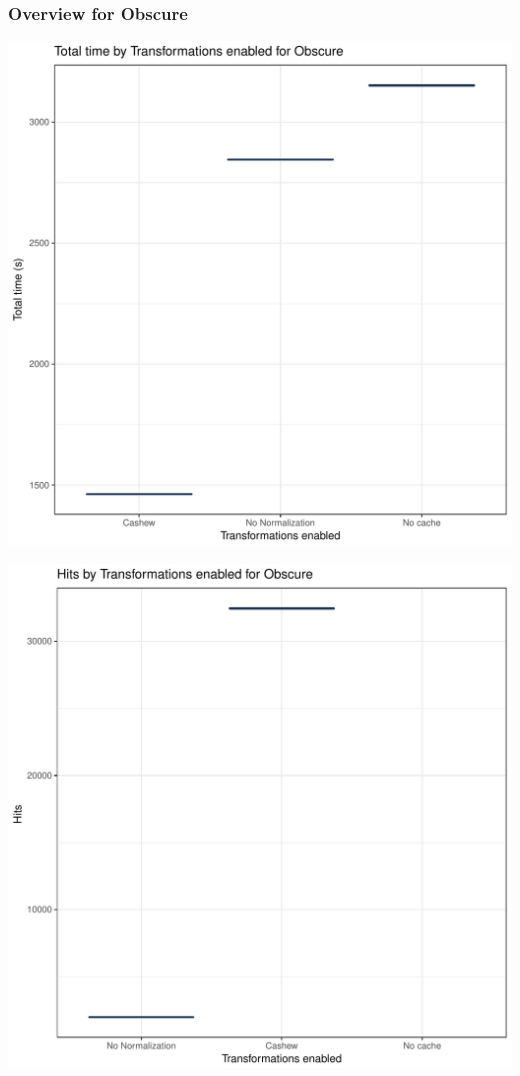 \documentclass{article}\usepackage[]{graphicx}\usepackage[]{color}
\makeatletter
\def\maxwidth{ %
  \ifdim\Gin@nat@width>\linewidth
    \linewidth
  \else
    \Gin@nat@width
  \fi
}
\newenvironment{knitrout}{}{} %
\makeatother
\begin{document}
\subsubsection{Overview for Obscure}
\begin{knitrout}
\color{fgcolor}
\includegraphics[width=\maxwidth]{figure/obscure-1} 

\includegraphics[width=\maxwidth]{figure/obscure-2} 


\end{knitrout}
\end{document}
